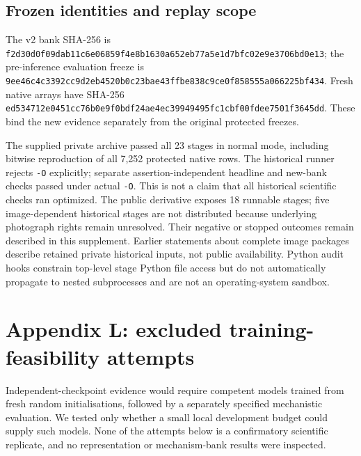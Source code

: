 \documentclass[
  british,
  11pt,
  a4paper,
]{article}
\begin{document}
\subsection{Frozen identities and replay
scope}\label{frozen-identities-and-replay-scope}

The v2 bank SHA-256 is
\texttt{f2d30d0f\allowbreak{}09dab11c\allowbreak{}6e06859f\allowbreak{}4e8b1630\allowbreak{}a652eb77\allowbreak{}a5e1d7bf\allowbreak{}c02e9e37\allowbreak{}06bd0e13};
the pre-inference evaluation freeze is
\texttt{9ee46c4c\allowbreak{}3392cc9d\allowbreak{}2eb4520b\allowbreak{}0c23bae4\allowbreak{}3ffbe838\allowbreak{}c9ce0f85\allowbreak{}8555a066\allowbreak{}225bf434}.
Fresh native arrays have SHA-256
\texttt{ed534712\allowbreak{}e0451cc7\allowbreak{}6b0e9f0b\allowbreak{}df24ae4e\allowbreak{}c3994949\allowbreak{}5fc1cbf0\allowbreak{}0fdee750\allowbreak{}1f3645dd}.
These bind the new evidence separately from the original protected
freezes.

The supplied private archive passed all 23 stages in normal mode,
including bitwise reproduction of all 7,252 protected native rows. The
historical runner rejects \texttt{-O} explicitly; separate
assertion-independent headline and new-bank checks passed under actual
\texttt{-O}. This is not a claim that all historical scientific checks
ran optimized. The public derivative exposes 18 runnable stages; five
image-dependent historical stages are not distributed because underlying
photograph rights remain unresolved. Their negative or stopped outcomes
remain described in this supplement. Earlier statements about complete
image packages describe retained private historical inputs, not public
availability. Python audit hooks constrain top-level stage Python file
access but do not automatically propagate to nested subprocesses and are
not an operating-system sandbox.

\section{Appendix L: excluded training-feasibility
attempts}\label{appendix-l-excluded-training-feasibility-attempts}

Independent-checkpoint evidence would require competent models trained
from fresh random initialisations, followed by a separately specified
mechanistic evaluation. We tested only whether a small local development
budget could supply such models. None of the attempts below is a
confirmatory scientific replicate, and no representation or
mechanism-bank results were inspected.
\end{document}
